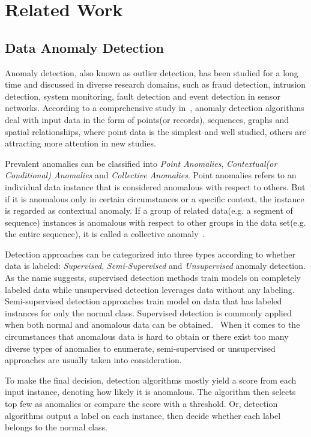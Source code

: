 \documentclass[a4paper]{IEEEtran}
\begin{document}
	\section{Related Work}\label{sec:related-work}
		\subsection{Data Anomaly Detection}
			Anomaly detection, also known as outlier detection, has been studied for a long time and discussed in diverse research domains, such as fraud detection, intrusion detection, system monitoring, fault detection and event detection in sensor networks. According to a comprehensive study in~\cite{chandola2009anomaly}, anomaly detection algorithms deal with input data in the form of points(or records), sequences, graphs and spatial relationships, where point data is the simplest and well studied, others are attracting more attention in new studies.
			
			Prevalent anomalies can be classified into \textit{Point Anomalies}, \textit{Contextual(or Conditional) Anomalies} and \textit{Collective Anomalies}. Point anomalies refers to an individual data instance that is considered anomalous with respect to others. But if it is anomalous only in certain circumstances or a specific context, the instance is regarded as contextual anomaly. If a group of related data(e.g. a segment of sequence) instances is anomalous with respect to other groups in the data set(e.g. the entire sequence), it is called a collective anomaly~\cite{goldberger2000components}.
			
			Detection approaches can be categorized into three types according to whether data is labeled: \textit{Supervised}, \textit{Semi-Supervised} and \textit{Unsupervised} anomaly detection. As the name suggests, supervised detection methods train models on completely labeled data while unsupervised detection leverages data without any labeling. Semi-supervised detection approaches train model on data that has labeled instances for only the normal class. Supervised detection is commonly applied when both normal and anomalous data can be obtained.~\cite{fujimaki2005approach} When it comes to the circumstances that anomalous data is hard to obtain or there exist too many diverse types of anomalies to enumerate, semi-supervised or unsupervised approaches are usually taken into consideration.
			
			To make the final decision, detection algorithms mostly yield a score from each input instance, denoting how likely it is anomalous. The algorithm then selects top few as anomalies or compare the score with a threshold. Or, detection algorithms output a label on each instance, then decide whether each label belongs to the normal class.
			
\end{document}
